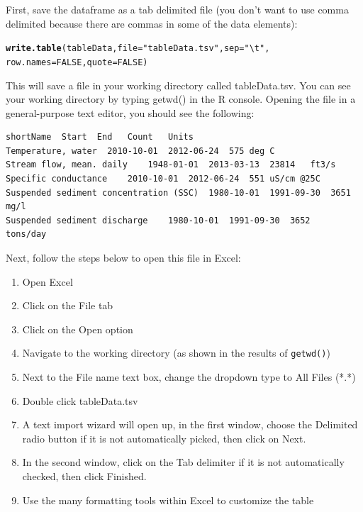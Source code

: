 \documentclass[a4paper,11pt]{article}\usepackage[]{graphicx}\usepackage[]{color}
\makeatletter
\newcommand{\hlnum}[1]{\textcolor[rgb]{0.686,0.059,0.569}{#1}}%
\newcommand{\hlstr}[1]{\textcolor[rgb]{0.192,0.494,0.8}{#1}}%
\newcommand{\hlstd}[1]{\textcolor[rgb]{0.345,0.345,0.345}{#1}}%
\newcommand{\hlkwc}[1]{\textcolor[rgb]{0.333,0.667,0.333}{#1}}%
\newcommand{\hlkwd}[1]{\textcolor[rgb]{0.737,0.353,0.396}{\textbf{#1}}}%
\newenvironment{kframe}{%
 \def\at@end@of@kframe{}%
 \ifinner\ifhmode%
  \def\at@end@of@kframe{\end{minipage}}%
  \begin{minipage}{\columnwidth}%
 \fi\fi%
 \def\FrameCommand##1{\hskip\@totalleftmargin \hskip-\fboxsep
 \colorbox{shadecolor}{##1}\hskip-\fboxsep
     \hskip-\linewidth \hskip-\@totalleftmargin \hskip\columnwidth}%
 \MakeFramed {\advance\hsize-\width
   \@totalleftmargin\z@ \linewidth\hsize
   \@setminipage}}%
 {\par\unskip\endMakeFramed%
 \at@end@of@kframe}
\newenvironment{knitrout}{}{} %
\makeatother
\begin{document}
First, save the dataframe as a tab delimited file (you don't want to use comma delimited because there are commas in some of the data elements):


\begin{knitrout}
\color{fgcolor}\begin{kframe}
\begin{alltt}
\hlkwd{write.table}\hlstd{(tableData,} \hlkwc{file}\hlstd{=}\hlstr{"tableData.tsv"}\hlstd{,}\hlkwc{sep}\hlstd{=}\hlstr{"\textbackslash{}t"}\hlstd{,}
            \hlkwc{row.names} \hlstd{=} \hlnum{FALSE}\hlstd{,}\hlkwc{quote}\hlstd{=}\hlnum{FALSE}\hlstd{)}
\end{alltt}
\end{kframe}
\end{knitrout}

This will save a file in your working directory called tableData.tsv.  You can see your working directory by typing getwd() in the R console. Opening the file in a general-purpose text editor, you should see the following:

\begin{verbatim}
shortName  Start  End	Count	Units
Temperature, water	2010-10-01	2012-06-24	575	deg C
Stream flow, mean. daily	1948-01-01	2013-03-13	23814	ft3/s
Specific conductance	2010-10-01	2012-06-24	551	uS/cm @25C
Suspended sediment concentration (SSC)	1980-10-01	1991-09-30	3651	mg/l
Suspended sediment discharge	1980-10-01	1991-09-30	3652	tons/day
\end{verbatim}

Next, follow the steps below to open this file in Excel:
\begin{enumerate}
\item Open Excel
\item Click on the File tab
\item Click on the Open option
\item Navigate to the working directory (as shown in the results of \texttt{getwd()})
\item Next to the File name text box, change the dropdown type to All Files (*.*)
\item Double click tableData.tsv
\item A text import wizard will open up, in the first window, choose the Delimited radio button if it is not automatically picked, then click on Next.
\item In the second window, click on the Tab delimiter if it is not automatically checked, then click Finished.
\item Use the many formatting tools within Excel to customize the table
\end{enumerate}
\end{document}
